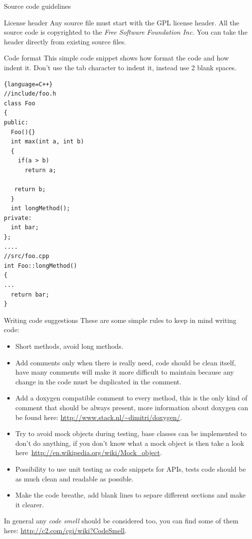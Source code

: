 \documentclass[12pt]{article}
\begin{document}
\begin{section}{Source code guidelines}

\begin{subsection}{License header}
Any source file must start with the GPL license header.  All the
source code is copyrighted to the \textit{Free Software Foundation
  Inc.}
You can take the header directly from existing source files.
\end{subsection}
  
\begin{subsection}{Code format}
This simple code snippet shows how format the code and how indent it.
Don't use the tab character to indent it, instead use 2 blank spaces. 
\begin{lstlisting}{language=C++}
//include/foo.h
class Foo
{
public:
  Foo(){}
  int max(int a, int b)
  {
    if(a > b)
      return a;

   return b;
  }
  int longMethod();
private:
  int bar;
};
....
//src/foo.cpp
int Foo::longMethod()
{
...
  return bar;
}
\end{lstlisting}
\end{subsection}

\begin{subsection}{Writing code suggestions}
These are some simple rules to keep in mind writing code:
\begin{itemize}
\item Short methods, avoid long methods.
\item Add comments only when there is really need, code should be
  clean itself, have many comments will make it more difficult to
  maintain because any change in the code must be duplicated in the
  comment.
\item Add a doxygen compatible comment to every method, this is the
  only kind of comment that should be always present, more information
  about doxygen can be found here:
  \url{http://www.stack.nl/~dimitri/doxygen/}.
\item Try to avoid mock objects during testing, base classes can be
  implemented to don't do anything, if you don't know what a mock
  object is then take a look
  here~\url{http://en.wikipedia.org/wiki/Mock_object}.
\item Possibility to use unit testing as code snippets for APIs, tests
  code should be as much clean and readable as possible.
\item Make the code breathe, add blank lines to separe different
  sections and make it clearer.
\end{itemize}
\end{subsection}
In general any \textit{code smell} should be considered too, you can
find some of them here: \url{http://c2.com/cgi/wiki?CodeSmell}.
\end{section}
\clearpage
\end{document}
